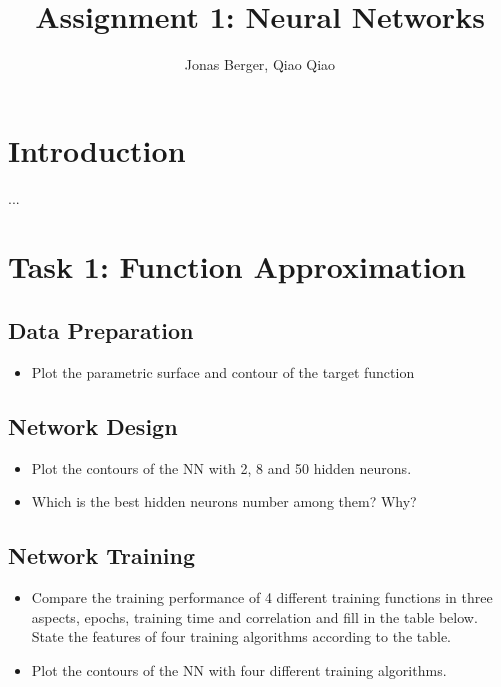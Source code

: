 \documentclass[a4paper,12pt]{article}
\title{Assignment 1: Neural Networks} %
\author{Jonas Berger, Qiao Qiao} %
\institute{Technische Universit\"{a}t M\"{u}nchen} %
\begin{document}
\maketitle

\section{Introduction}
...



\section{Task 1: Function Approximation}

\subsection{Data Preparation}

\begin{itemize}

 \item Plot the parametric surface and contour of the target function

\end{itemize}

\subsection{Network Design}

\begin{itemize}

	\item Plot the contours of the NN with 2, 8 and 50 hidden neurons.

	\item Which is the best hidden neurons number among them? Why?

\end{itemize}

\subsection{Network Training}

\begin{itemize}
	
	\item Compare the training performance of 4 different training functions in three aspects, epochs, training time and correlation and fill in the table below. State the features of four training algorithms according to the table.\\

	\item Plot the contours of the NN with four different training algorithms.

\end{itemize}
\end{document}
